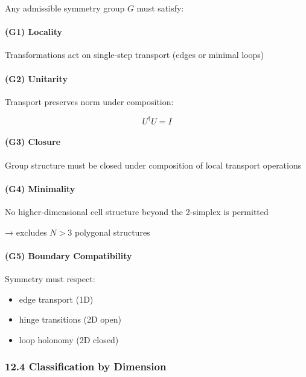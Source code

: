 \documentclass[
]{article}
\providecommand{\tightlist}{%
  \setlength{\itemsep}{0pt}\setlength{\parskip}{0pt}}
\begin{document}
Any admissible symmetry group \(G\) must satisfy:

\paragraph{(G1) Locality}\label{g1-locality}

Transformations act on single-step transport (edges or minimal loops)

\paragraph{(G2) Unitarity}\label{g2-unitarity}

Transport preserves norm under composition:

\[
U^\dagger U = I
\]

\paragraph{(G3) Closure}\label{g3-closure}

Group structure must be closed under composition of local transport
operations

\paragraph{(G4) Minimality}\label{g4-minimality}

No higher-dimensional cell structure beyond the 2-simplex is permitted

→ excludes \(N > 3\) polygonal structures

\paragraph{(G5) Boundary Compatibility}\label{g5-boundary-compatibility}

Symmetry must respect:

\begin{itemize}
\tightlist
\item
  edge transport (1D)
\item
  hinge transitions (2D open)
\item
  loop holonomy (2D closed)
\end{itemize}

\subsubsection{12.4 Classification by
Dimension}\label{classification-by-dimension}
\end{document}

